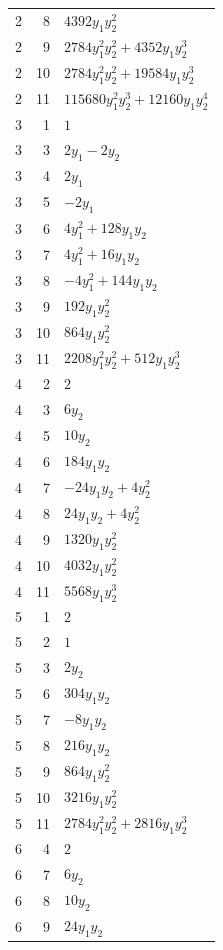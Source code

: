 \documentclass[10pt,a4paper]{article}
\begin{document}
{\begin{longtable}{rrp{125mm}}
2 & 8 & $4392 y_{1} y_{2}^{2}$\\
2 & 9 & $2784 y_{1}^{2} y_{2}^{2} + 4352 y_{1} y_{2}^{3}$\\
2 & 10 & $2784 y_{1}^{2} y_{2}^{2} + 19584 y_{1} y_{2}^{3}$\\
2 & 11 & $115680 y_{1}^{2} y_{2}^{3} + 12160 y_{1} y_{2}^{4}$\\
3 & 1 & $1$\\
3 & 3 & $2 y_{1} - 2 y_{2}$\\
3 & 4 & $2 y_{1}$\\
3 & 5 & $- 2 y_{1}$\\
3 & 6 & $4 y_{1}^{2} + 128 y_{1} y_{2}$\\
3 & 7 & $4 y_{1}^{2} + 16 y_{1} y_{2}$\\
3 & 8 & $- 4 y_{1}^{2} + 144 y_{1} y_{2}$\\
3 & 9 & $192 y_{1} y_{2}^{2}$\\
3 & 10 & $864 y_{1} y_{2}^{2}$\\
3 & 11 & $2208 y_{1}^{2} y_{2}^{2} + 512 y_{1} y_{2}^{3}$\\
4 & 2 & $2$\\
4 & 3 & $6 y_{2}$\\
4 & 5 & $10 y_{2}$\\
4 & 6 & $184 y_{1} y_{2}$\\
4 & 7 & $- 24 y_{1} y_{2} + 4 y_{2}^{2}$\\
4 & 8 & $24 y_{1} y_{2} + 4 y_{2}^{2}$\\
4 & 9 & $1320 y_{1} y_{2}^{2}$\\
4 & 10 & $4032 y_{1} y_{2}^{2}$\\
4 & 11 & $5568 y_{1} y_{2}^{3}$\\
5 & 1 & $2$\\
5 & 2 & $1$\\
5 & 3 & $2 y_{2}$\\
5 & 6 & $304 y_{1} y_{2}$\\
5 & 7 & $- 8 y_{1} y_{2}$\\
5 & 8 & $216 y_{1} y_{2}$\\
5 & 9 & $864 y_{1} y_{2}^{2}$\\
5 & 10 & $3216 y_{1} y_{2}^{2}$\\
5 & 11 & $2784 y_{1}^{2} y_{2}^{2} + 2816 y_{1} y_{2}^{3}$\\
6 & 4 & $2$\\
6 & 7 & $6 y_{2}$\\
6 & 8 & $10 y_{2}$\\
6 & 9 & $24 y_{1} y_{2}$\\

\end{longtable}}
\end{document}
